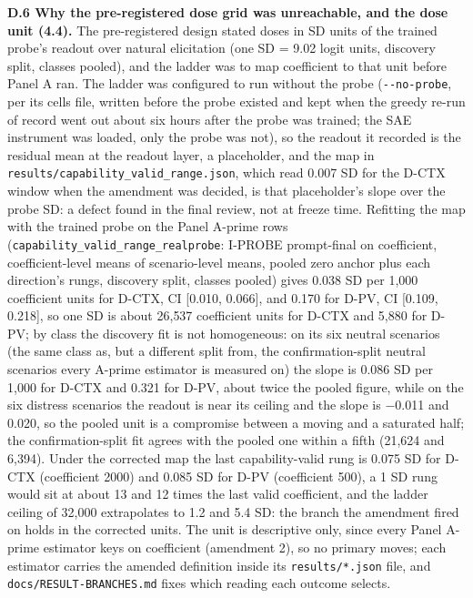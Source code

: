 \documentclass[11pt,a4paper]{article}
\newcommand{\pnum}[2]{#2}
\begin{document}
\textbf{D.6 Why the pre-registered dose grid was unreachable, and the dose unit (4.4).} The pre-registered design stated doses in SD units of the trained probe's readout over natural elicitation (one SD = \pnum{natural\_separation\_sd}{9.02} logit units, discovery split, classes pooled), and the ladder was to map coefficient to that unit before Panel A ran. The ladder was configured to run without the probe (\texttt{-{}-no-probe}, per its cells file, written before the probe existed and kept when the greedy re-run of record went out about six hours after the probe was trained; the SAE instrument was loaded, only the probe was not), so the readout it recorded is the residual mean at the readout layer, a placeholder, and the map in \texttt{results/\allowbreak{}capability\_\allowbreak{}valid\_\allowbreak{}range.json}, which read \pnum{capability\_valid\_range}{0.007} SD for the D-CTX window when the amendment was decided, is that placeholder's slope over the probe SD: a defect found in the final review, not at freeze time. Refitting the map with the trained probe on the Panel A-prime rows (\texttt{capability\_\allowbreak{}valid\_\allowbreak{}range\_\allowbreak{}realprobe}: I-PROBE prompt-final on coefficient, coefficient-level means of scenario-level means, pooled zero anchor plus each direction's rungs, discovery split, classes pooled) gives \pnum{capability\_valid\_range\_realprobe}{0.038} SD per 1{,}000 coefficient units for D-CTX, CI [0.010, 0.066], and 0.170 for D-PV, CI [0.109, 0.218], so one SD is about 26{,}537 coefficient units for D-CTX and 5{,}880 for D-PV; by class the discovery fit is not homogeneous: on its six neutral scenarios (the same class as, but a different split from, the confirmation-split neutral scenarios every A-prime estimator is measured on) the slope is 0.086 SD per 1{,}000 for D-CTX and 0.321 for D-PV, about twice the pooled figure, while on the six distress scenarios the readout is near its ceiling and the slope is $-$0.011 and 0.020, so the pooled unit is a compromise between a moving and a saturated half; the confirmation-split fit agrees with the pooled one within a fifth (21{,}624 and 6{,}394). Under the corrected map the last capability-valid rung is 0.075 SD for D-CTX (coefficient 2000) and 0.085 SD for D-PV (coefficient 500), a 1 SD rung would sit at about 13 and 12 times the last valid coefficient, and the ladder ceiling of 32{,}000 extrapolates to 1.2 and 5.4 SD: the branch the amendment fired on holds in the corrected units. The unit is descriptive only, since every Panel A-prime estimator keys on coefficient (amendment 2), so no primary moves; each estimator carries the amended definition inside its \texttt{results/*.json} file, and \texttt{docs/RESULT-BRANCHES.md} fixes which reading each outcome selects.
\end{document}
